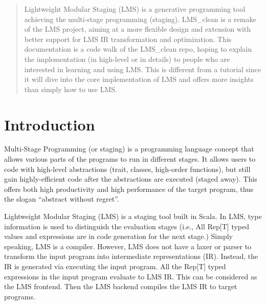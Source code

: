 \documentclass[acmsmall,review]{acmart}\settopmatter{printfolios=false,printccs=false,printacmref=false}
\begin{document}
\begin{abstract}
Lightweight Modular Staging (LMS) is a generative programming tool achieving the multi-stage programming (staging).
LMS\_clean is a remake of the LMS project, aiming at a more flexible design and extension with better support for
LMS IR transformation and optimization. This documentation is a code walk of the LMS\_clean repo, hoping to
explain the implementation (in high-level or in details) to people who are interested in learning and using LMS.
This is different from a tutorial since it will dive into the core implementation of LMS and offers more insights
than simply how to use LMS.
\end{abstract}

\maketitle

\section{Introduction}

Multi-Stage Programming (or staging) is a programming language concept that allows various parts of the programs
to run in different stages. It allows users to code with high-level abstractions (trait, classes, high-order functions),
but still gain highly-efficient code after the abstractions are executed (staged away). This offers both high
productivity and high performance of the target program, thus the slogan ``abstract without regret''.

Lightweight Modular Staging (LMS) is a staging tool built in Scala. In LMS, type information is used to distinguish
the evaluation stages (i.e., All Rep[T] typed values and expressions are in code generation for the next stage.)
Simply speaking, LMS is a compiler. However, LMS does not have a laxer or parser to transform the input program
into intermediate representations (IR). Instead, the IR is generated via executing the input program. All the Rep[T]
typed expressions in the input program evaluate to LMS IR. This can be considered as the LMS frontend.
Then the LMS backend compiles the LMS IR to target programs.






%   

%

\pagebreak
\end{document}
